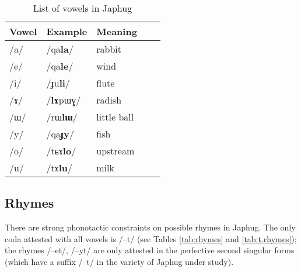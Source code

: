 \documentclass[oldfontcommands,oneside,a4paper,11pt]{article}
\newcommand{\ipa}[1]{{\phon/#1/}} %
\begin{document}
     \begin{table}
      \caption{List of vowels in Japhug} \label{tab:vowels}  \centering
     \begin{tabular}{lllll}
     \toprule
Vowel & Example & Meaning \\
\midrule
\ipa{a} &	\ipa{qa\textbf{la}} & rabbit\\
\ipa{e} &	\ipa{qa\textbf{le}} &wind\\
\ipa{i} &	\ipa{ɟu\textbf{li}} &flute\\
\ipa{ɤ} &	\ipa{\textbf{lɤ}pɯɣ} & radish\\
\ipa{ɯ} &	\ipa{rɯ\textbf{lɯ}} &little ball\\
\ipa{y} &	\ipa{qa\textbf{ɟy}} &fish\\
\ipa{o} &	\ipa{tɕɤ\textbf{lo}} &upstream\\
\ipa{u} &	\ipa{tɤ\textbf{lu}} &milk\\
     \bottomrule
     \end{tabular}
     \end{table}
     
     
\subsection{Rhymes}     \label{sec:rhymes}
     There are strong phonotactic constraints on possible rhymes in Japhug. The only coda attested with all  vowels is \ipa{--t} (see Tables \ref{tab:rhymes} and \ref{tab:t.rhymes}); the rhymes \ipa{--et}, \ipa{--yt} are only attested in the perfective second singular forms (which have a suffix \ipa{--t} in the variety of Japhug under study).
 
\end{document}
